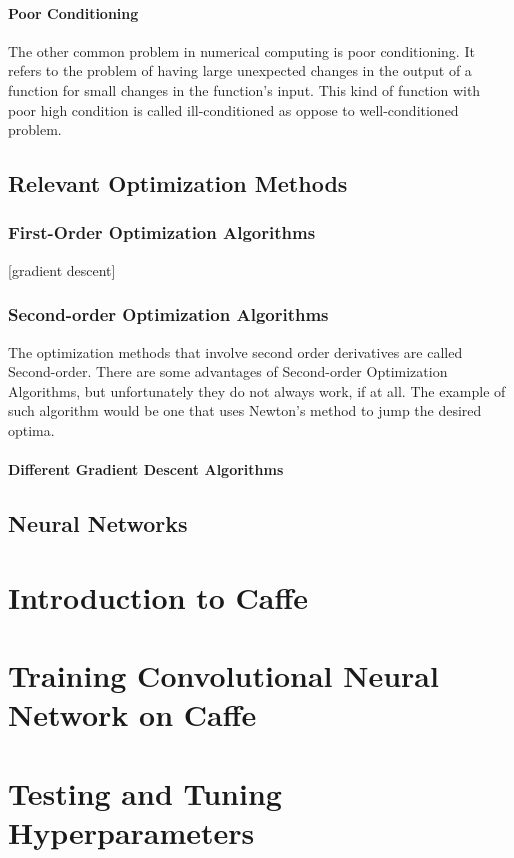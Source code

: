 \documentclass[paper=a4, fontsize=11pt]{scrartcl}
\numberwithin{equation}{section}		%
\numberwithin{figure}{section}			%
\numberwithin{table}{section}			%
\begin{document}
	\paragraph{Poor Conditioning}  
	The other common problem in numerical computing is poor conditioning. It refers to the problem of having large unexpected changes in the output of a function for small changes in the function's input. This kind of function with poor high condition is called ill-conditioned as oppose to well-conditioned problem.
	
	\subsection{Relevant Optimization Methods}
	\subsubsection{First-Order Optimization Algorithms}
	[gradient descent]
	\subsubsection{Second-order Optimization Algorithms}
	The optimization methods that involve second order derivatives are called Second-order. There are some advantages of Second-order Optimization Algorithms, but unfortunately they do not always work, if at all. The example of such algorithm would be one that uses Newton's method to jump the desired optima. 
	
	\paragraph{Different Gradient Descent Algorithms}
	
	\subsection{Neural Networks}
	
	
	\section{Introduction to Caffe}
	\section{Training Convolutional Neural Network on Caffe}
	\section{Testing and Tuning Hyperparameters}
\end{document}
